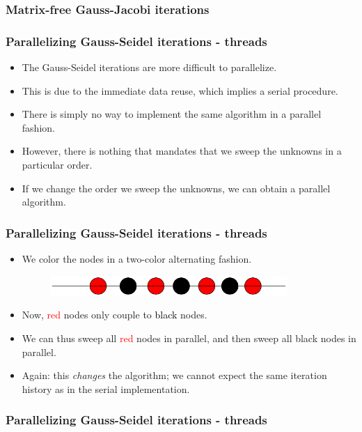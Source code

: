 \documentclass{beamer}
\begin{document}
\begin{frame}\frametitle{Matrix-free Gauss-Jacobi iterations}
   
\end{frame}
\begin{frame}\frametitle{Parallelizing Gauss-Seidel iterations - threads}
  \begin{itemize}
    \item The Gauss-Seidel iterations are more difficult to parallelize.
    \item This is due to the immediate data reuse, which implies a serial procedure.
    \item There is simply no way to implement the same algorithm in a parallel fashion.
    \item However, there is nothing that mandates that we sweep the unknowns in a particular order.
    \item If we change the order we sweep the unknowns, we can obtain a parallel algorithm.
  \end{itemize}
\end{frame}
\begin{frame}\frametitle{Parallelizing Gauss-Seidel iterations - threads}
  \begin{itemize}
    \item We color the nodes in a two-color alternating fashion.
       \begin{figure}[H]
        \begin{center}
          \includegraphics[width=9cm]{redblack}
        \end{center}
      \end{figure}
    \item Now, \textcolor{red}{red} nodes only couple to \textcolor{black}{black} nodes.
    \item We can thus sweep all \textcolor{red}{red} nodes in parallel, and then sweep all black nodes in parallel.
    \item Again: this \emph{changes} the algorithm; we cannot expect the same iteration history as in the serial implementation.
  \end{itemize}
\end{frame}
\begin{frame}\frametitle{Parallelizing Gauss-Seidel iterations - threads}
   
\end{frame}
\end{document}
